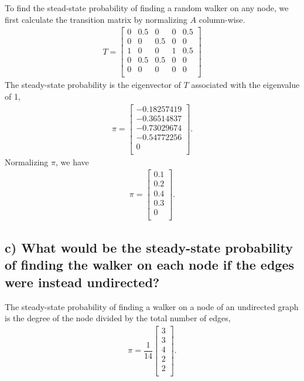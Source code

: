\documentclass{tufte-handout}
\begin{document}
To find the stead-state probability of finding a random walker on any node, we first calculate the transition matrix by normalizing $A$ column-wise.
\begin{align*}
T =
\begin{bmatrix}
0 & 0.5 &  0   &  0 & 0.5 \\
0 & 0   &  0.5 &  0 & 0   \\
1 & 0   &  0   &  1 & 0.5 \\
0 & 0.5 &  0.5 &  0 & 0   \\
0 & 0   &  0   &  0 & 0   \\
\end{bmatrix}
\end{align*}
The steady-state probability is the eigenvector of $T$ associated with the eigenvalue of 1,
\begin{align*}
\pi =
\begin{bmatrix}
-0.18257419 \\
-0.36514837 \\
-0.73029674 \\
-0.54772256 \\
 0          \\
\end{bmatrix}.
\end{align*}
Normalizing $\pi$, we have
\begin{align*}
\pi =
\begin{bmatrix}
0.1 \\
0.2 \\
0.4 \\
0.3 \\
0 \\
\end{bmatrix}.
\end{align*}

\subsection{c)
What would be the steady-state probability of finding the walker on each node if the edges were instead undirected?}

The steady-state probability of finding a walker on a node of an undirected graph is the degree of the node divided by the total number of edges,
\begin{align*}
\pi = \dfrac{1}{14}
\begin{bmatrix}
3 \\
3 \\
4 \\
2 \\
2 \\
\end{bmatrix}.
\end{align*}
\end{document}
